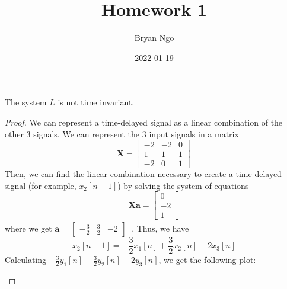 \documentclass{article}
\title{Homework 1}
\author{Bryan Ngo}
\date{2022-01-19}
\begin{document}
\maketitle

\setcounter{section}{1}

\section{}

\subsection{}

\begin{theorem}
    The system \(L\) is not time invariant.
\end{theorem}
\begin{proof}
    We can represent a time-delayed signal as a linear combination of the other 3 signals.
    We can represent the 3 input signals in a matrix
    \begin{equation}
        \bm{X} =
        \begin{bmatrix}
           -2 & -2 & 0 \\
           1 & 1 & 1 \\
           -2 & 0 & 1 
        \end{bmatrix}
    \end{equation}
    Then, we can find the linear combination necessary to create a time delayed signal (for example, \(x_2[n - 1]\)) by solving the system of equations
    \begin{equation}
        \bm{Xa} =
        \begin{bmatrix}
            0 \\
            -2 \\
            1
        \end{bmatrix}
    \end{equation}
    where we get \(\bm{a} = \begin{bmatrix}
        -\frac{3}{2} & \frac{3}{2} & -2
    \end{bmatrix}^\top\).
    Thus, we have
    \begin{equation}
        x_2[n - 1] = -\frac{3}{2} x_1[n] + \frac{3}{2} x_2[n] - 2x_3[n]
    \end{equation}
    Calculating \(-\frac{3}{2} y_1[n] + \frac{3}{2} y_2[n] - 2y_3[n]\),
    we get the following plot:
    \begin{center}
        \begin{tikzpicture}

\end{tikzpicture}
\end{center}
\end{proof}
\end{document}
